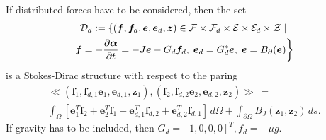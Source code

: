 \documentclass[preprint,12pt]{elsarticle}
\begin{document}
		If distributed forces have to be considered, then the set
		\begin{multline}
		\mathcal{D}_d := \left\{ (\bm{f}, \bm{f}_d, \bm{e}, \bm{e}_d, \bm{z}) \in \mathcal{F}\times\mathcal{F}_d\times\mathcal{E}\times\mathcal{E}_d\times\mathcal{Z} \; |  \right. \\
		\left. \bm{f}= - \diffp{\bm{\alpha}}{t} = -J \bm{e} - G_d \bm{f}_d, \; \bm{e}_d = G^*_d \bm{e}, \;  \bm{e} = B_{\partial}(\bm{e}) \right\}
		\end{multline}
		is a Stokes-Dirac structure with respect to the paring 
		\begin{multline}
		\ll (\bm{f}_1, \bm{f}_{d, 1} \bm{e}_1, \bm{e}_{d, 1}, \bm{z}_1), (\bm{f}_2, \bm{f}_{d, 2} \bm{e}_2, \bm{e}_{d, 2}, \bm{z}_2) \gg  \,= \\
		\int_{\Omega} \left[ \bm{e}_1^T \bm{f}_2 + \bm{e}_2^T \bm{f}_1 + \bm{e}_{d, 1}^T \bm{f}_{d, 2} + \bm{e}_{d, 2}^T \bm{f}_{d, 1} \right] \, d\Omega  + \int_{\partial \Omega} B_J(\bm{z}_1, \bm{z}_2) \, ds.
		\end{multline}
		If gravity has to be included, then $G_d=[1, 0, 0, 0]^T, f_d = -\mu g$.  \\
		
\end{document}
